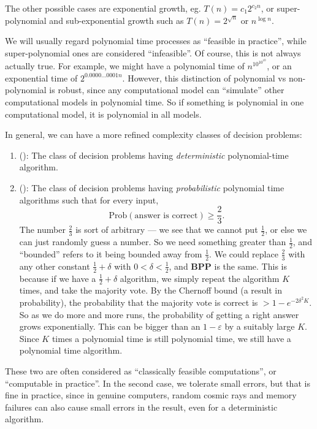 \documentclass[a4paper]{article}
\begin{document}
The other possible cases are exponential growth, eg. $T(n) = c_1 2^{c_2 n}$, or super-polynomial and sub-exponential growth such as $T(n) = 2^{\sqrt{n}}$ or $n^{\log n}$.

We will usually regard polynomial time processes as ``feasible in practice'', while super-polynomial ones are considered ``infeasible''. Of course, this is not always actually true. For example, we might have a polynomial time of $n^{10^{10^{10}}}$, or an exponential time of $2^{0.0000\ldots0001 n}$. However, this distinction of polynomial vs non-polynomial is robust, since any computational model can ``simulate'' other computational models in polynomial time. So if something is polynomial in one computational model, it is polynomial in all models.

In general, we can have a more refined complexity classes of decision problems:
\begin{enumerate}
  \item {} (): The class of decision problems having \emph{deterministic} polynomial-time algorithm.
  \item {} (): The class of decision problems having \emph{probabilistic} polynomial time algorithms such that for every input,
    \[
      \mathrm{Prob}(\text{answer is correct}) \geq \frac{2}{3}.
    \]
    The number $\frac{2}{3}$ is sort of arbitrary --- we see that we cannot put $\frac{1}{2}$, or else we can just randomly guess a number. So we need something greater than $\frac{1}{2}$, and ``bounded'' refers to it being bounded away from $\frac{1}{2}$. We could replace $\frac{2}{3}$ with any other constant $\frac{1}{2} + \delta$ with $0 < \delta < \frac{1}{2}$, and \textbf{BPP} is the same. This is because if we have a $\frac{1}{2} + \delta$ algorithm, we simply repeat the algorithm $K$ times, and take the majority vote. By the Chernoff bound (a result in probability), the probability that the majority vote is correct is $> 1 - e^{-2 \delta^2 K}$. So as we do more and more runs, the probability of getting a right answer grows exponentially. This can be bigger than an $1 - \varepsilon$ by a suitably large $K$. Since $K$ times a polynomial time is still polynomial time, we still have a polynomial time algorithm.
\end{enumerate}
These two are often considered as ``classically feasible computations'', or ``computable in practice''. In the second case, we tolerate small errors, but that is fine in practice, since in genuine computers, random cosmic rays and memory failures can also cause small errors in the result, even for a deterministic algorithm.
\end{document}
